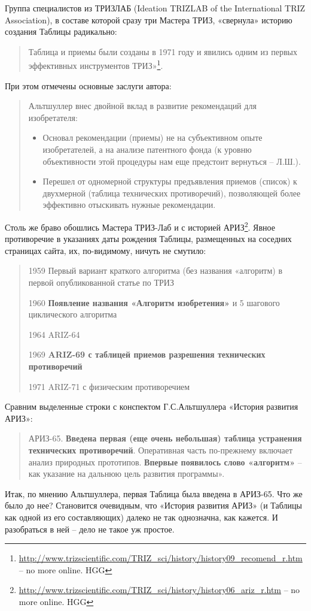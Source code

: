 \documentclass[11pt,a4paper]{article}
\begin{document}
Группа специалистов из ТРИЗЛАБ (Ideation TRIZLAB of the International TRIZ
Associa\-tion), в составе которой сразу три Мастера ТРИЗ, «свернула» историю
создания Таблицы радикально: 
\begin{quote}
  Таблица и приемы были созданы в 1971 году и явились одним из первых
  эффективных инструментов
  ТРИЗ»\footnote{\url{http://www.trizscientific.com/TRIZ_sci/history/history09_recomend_r.htm}
    -- no more online. HGG}.
\end{quote}
При этом отмечены основные заслуги автора:
\begin{quote}
  Альтшуллер внес двойной вклад в развитие рекомендаций для изобретателя:
  \begin{itemize}
  \item Основал рекомендации (приемы) не на субъективном опыте изобретателей,
    а на анализе патентного фонда (к уровню объективности этой процедуры нам
    еще предстоит вернуться -- Л.Ш.).
  \item Перешел от одномерной структуры предъявления приемов (список) к
    двухмерной (таблица технических противоречий), позволяющей более
    эффективно отыскивать нужные рекомендации.
  \end{itemize}
\end{quote}
Столь же браво обошлись Мастера ТРИЗ-Лаб и с историей
АРИЗ\footnote{\url{http://www.trizscientific.com/TRIZ_sci/history/history06_ariz_r.htm}
  -- no more online. HGG}.  Явное противоречие в указаниях даты рождения
Таблицы, размещенных на соседних страницах сайта, их, по-видимому, ничуть не
смутило:
\begin{quote}  
  1959 Первый вариант краткого алгоритма (без названия «алгоритм) в первой
  опубликованной статье по ТРИЗ

  1960 \textbf{Появление названия «Алгоритм изобретения»} и 5 шагового
  циклического алгоритма

  1964 ARIZ-64

  1969 \textbf{ARIZ-69 с таблицей приемов разрешения технических противоречий} 

  1971 ARIZ-71 с физическим противоречием
\end{quote}
Сравним выделенные строки с конспектом Г.С.Альтшуллера «История развития
АРИЗ»:
\begin{quote}  
  АРИЗ-65. \textbf{Введена первая (еще очень небольшая) таблица устранения
    технических противоречий}. Оперативная часть по-прежнему включает анализ
  природных прототипов. \textbf{Впервые появилось слово «алгоритм»} -- как
  указание на дальнюю цель развития программы». \cite{Altshuller1986a}
\end{quote}
Итак, по мнению Альтшуллера, первая Таблица была введена в АРИЗ-65. Что же
было до нее? Становится очевидным, что «История развития АРИЗ» (и Таблицы как
одной из его составляющих) далеко не так однозначна, как кажется. И
разобраться в ней -- дело не такое уж простое.
\end{document}
